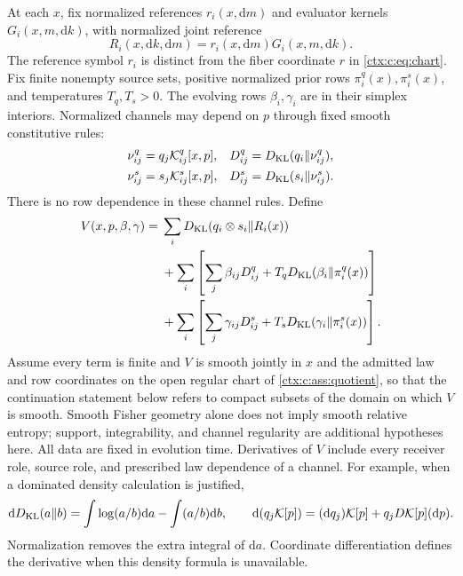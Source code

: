 At each $x$, fix normalized references $r_i(x,\mathrm d m)$ and evaluator kernels $G_i(x,m,\mathrm d k)$, with normalized joint reference
\begin{equation}
 R_i(x,\mathrm d k,\mathrm d m)=r_i(x,\mathrm d m)G_i(x,m,\mathrm d k).
\end{equation}
The reference symbol $r_i$ is distinct from the fiber coordinate $r$ in \cref{ctx:c:eq:chart}. Fix finite nonempty source sets, positive normalized prior rows $\pi_i^q(x),\pi_i^s(x)$, and temperatures $T_q,T_s>0$. The evolving rows $\beta_i,\gamma_i$ are in their simplex interiors. Normalized channels may depend on $p$ through fixed smooth constitutive rules:
\begin{align}
 \nu^q_{ij}&=q_j\mathcal K^q_{ij}[x,p],&
 D^q_{ij}&=D_{\mathrm{KL}}(q_i\Vert\nu^q_{ij}),\\
 \nu^s_{ij}&=s_j\mathcal K^s_{ij}[x,p],&
 D^s_{ij}&=D_{\mathrm{KL}}(s_i\Vert\nu^s_{ij}).
\end{align}
There is no row dependence in these channel rules. Define
\begin{align}
 V(x,p,\beta,\gamma)={}&\sum_iD_{\mathrm{KL}}(q_i\otimes s_i\Vert R_i(x))\nonumber\\
 &+\sum_i\left[\sum_j\beta_{ij}D^q_{ij}
                   +T_qD_{\mathrm{KL}}(\beta_i\Vert\pi_i^q(x))\right]\nonumber\\
 &+\sum_i\left[\sum_j\gamma_{ij}D^s_{ij}
                   +T_sD_{\mathrm{KL}}(\gamma_i\Vert\pi_i^s(x))\right].
 \label{ctx:c:eq:V}
\end{align}
Assume every term is finite and $V$ is smooth jointly in $x$ and the admitted law and row coordinates on the open regular chart of \cref{ctx:c:ass:quotient}, so that the continuation statement below refers to compact subsets of the domain on which $V$ is smooth. Smooth Fisher geometry alone does not imply smooth relative entropy; support, integrability, and channel regularity are additional hypotheses here. All data are fixed in evolution time. Derivatives of $V$ include every receiver role, source role, and prescribed law dependence of a channel. For example, when a dominated density calculation is justified,
\begin{equation}
 \mathrm dD_{\mathrm{KL}}(a\Vert b)=\int\log(a/b)\mathrm d a-\int(a/b)\mathrm d b,
 \qquad
 \mathrm d(q_j\mathcal K[p])=(\mathrm d q_j)\mathcal K[p]+q_jD\mathcal K[p](\mathrm d p).
 \label{ctx:c:eq:roles}
\end{equation}
Normalization removes the extra integral of $\mathrm d a$. Coordinate differentiation defines the derivative when this density formula is unavailable.

